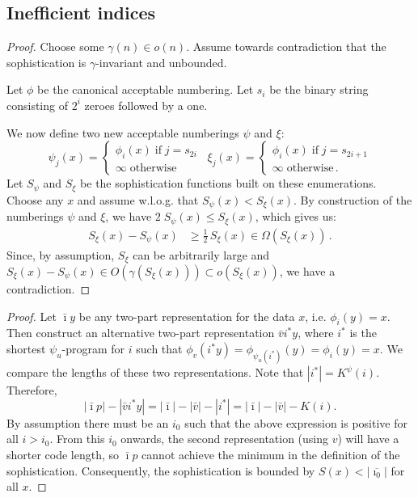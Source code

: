\documentclass{style/llncs}
\newcommand{\s}{S}
\newcommand{\p}{\,\text{.}}
\begin{document}
\subsection{Inefficient indices}
\label{section:appendix-inefficient-indices}

\ineffindices*

\begin{proof}
Choose some $\gamma(n) \in o(n)$. Assume towards contradiction that the sophistication is $\gamma$-invariant and unbounded.

Let $\phi$ be the canonical acceptable numbering. Let $s_i$ be the binary string consisting of $2^{i}$ zeroes followed by a one.

We now define two new acceptable numberings $\psi$ and $\xi$:
\[
\psi_j(x) = \begin{cases}
	\phi_i(x) \;\text{if}\; j = s_{2i}\\
	\infty\;\text{otherwise}
\end{cases}\,\,\,
\xi_j(x) = 
\begin{cases}
	\phi_i(x) \;\text{if}\; j = s_{2i+1} \\
	\infty \;\text{otherwise}\p
\end{cases}
\]
Let $\s_\psi$ and $\s_\xi$ be the sophistication functions built on these enumerations. Choose any $x$ and assume w.l.o.g. that $\s_\psi(x) < \s_\xi(x)$. By construction of the numberings $\psi$ and $\xi$, we have $2\;\s_\psi(x)  \leq \s_\xi(x)$, which gives us:
\begin{align*}
	\s_\xi(x) - \s_\psi(x) &\geq \frac{1}{2}\, \s_\xi(x)  \in \Omega(\s_\xi(x))\p 
\end{align*}
Since, by assumption, $\s_\xi$ can be arbitrarily large and $\s_\xi(x) - \s_\psi(x) \in O(\gamma(\s_\xi(x))) \subset o(\s_\xi(x))$, we have a contradiction.
\end{proof}

\ineffprefix*
\begin{proof}
Let $\bar\imath y$ be any two-part representation for the data $x$, i.e. $\phi_i(y)=x$. Then construct an alternative two-part representation $\bar vi^* y$, where $i^*$ is the shortest $\psi_u$-program for $i$ such that $\phi_v(i^* y)=\phi_{\psi_u(i^*)}(y) = \phi_i(y)=x$. We compare the lengths of these two representations. Note that $|i^*|=K^\psi(i)$. Therefore,
\[
|\bar\imath p|-|\bar v i^* y| = |\bar\imath|-|\bar v| - |i^*| = |\bar\imath|-|\bar v|-K(i).
\]
By assumption there must be an $i_0$ such that the above expression is positive for all $i>i_0$. From this $i_0$ onwards, the second representation (using $v$) will have a shorter code length, so $\bar\imath p$ cannot achieve the minimum in the definition of the sophistication. Consequently, the sophistication is bounded by $\s(x)<|\overline{\imath_0}|$ for all $x$. 
\end{proof}
\end{document}

